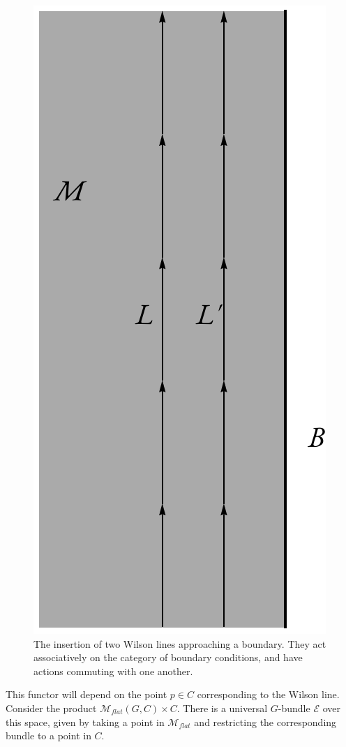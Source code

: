	\begin{figure}
		\centering
		\includegraphics[scale=0.5]{figures/Wilson}
		\caption{The insertion of two Wilson lines approaching a boundary. They act associatively on the category of boundary conditions, and have actions commuting with one another.}
		\label{fig:wilson}
	\end{figure}
	
	 This functor will depend on the point $p \in C$ corresponding to the Wilson line. Consider the product $\mathcal M_{flat} (G, C) \times C$. There is a universal $G$-bundle $\mathcal E$ over this space, given by taking a point in $\mathcal M_{flat}$ and restricting the corresponding bundle to a point in $C$. 
	
